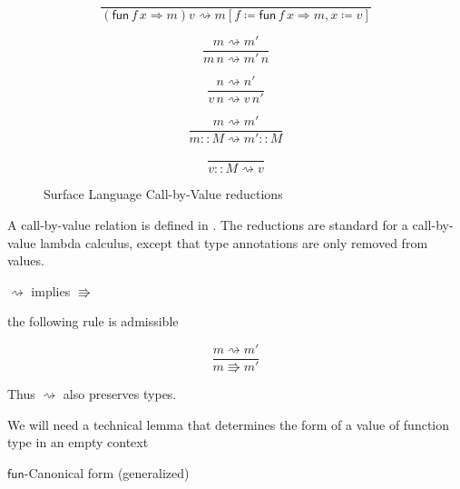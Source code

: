 \begin{figure}
\[
\frac{\,}{\left(\mathsf{fun}\,f\,x\Rightarrow m\right)v\rightsquigarrow m\left[f\coloneqq\mathsf{fun}\,f\,x\Rightarrow m,x\coloneqq v\right]}
\]

\[
\frac{m\rightsquigarrow m'}{m\,n\rightsquigarrow m'\,n}
\]

\[
\frac{n\rightsquigarrow n'}{v\,n\rightsquigarrow v\,n'}
\]

\[
\frac{m\rightsquigarrow m'}{m::M\rightsquigarrow m'::M}
\]

\[
\frac{\,}{v::M\rightsquigarrow v}
\]

\caption{Surface Language Call-by-Value reductions}
\label{fig:surface-reduction-step}
\end{figure}

A call-by-value relation is defined in .
The reductions are standard for a call-by-value lambda calculus, except that type annotations are only removed from values.

\begin{fact}
$\rightsquigarrow$ implies $\Rrightarrow$

the following rule is admissible

\[
\frac{m\rightsquigarrow m'}{m\Rrightarrow m'}
\]
\end{fact}

Thus $\rightsquigarrow$ also preserves types.

We will need a technical lemma that determines the form of a value of function type in an empty context

\begin{lem}
  $\mathsf{fun}$-Canonical form (generalized)
  \end{lem}
  
